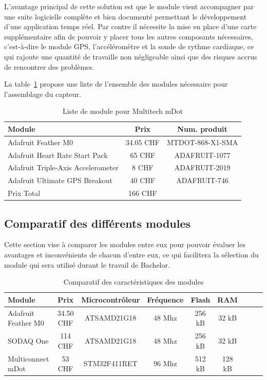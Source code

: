 L’avantage principal de cette solution est que le module vient accompagner par une suite logicielle complète et bien documenté permettant le développement d’une application temps réel. Par contre il nécessite la mise en place d’une carte supplémentaire afin de pouvoir y placer tous les autres composants nécessaires, c’est-à-dire le module GPS, l’accéléromètre et la sonde de rythme cardiaque, ce qui rajoute une quantité de travaille non négligeable ainsi que des risques accrus de rencontrer des problèmes.

La table~\ref{tab:mdot_liste} propose une liste de l'ensemble des modules nécessaire pour l'assemblage du capteur.

\begin{table}[htb]
\caption[Multitech mDot List]{Liste de module pour Multitech mDot}
\label{tab:mdot_liste}
\centering
\begin{tabular}{lcc}
\toprule
Module & Prix & Num. produit \\ 
\midrule
Adafruit Feather M0 & 34.05 CHF & MTDOT-868-X1-SMA \\
Adafruit Heart Rate Start Pack & 65 CHF & ADAFRUIT-1077 \\
Adafruit Triple-Axis Accelerometer & 8 CHF & ADAFRUIT-2019 \\
Adafruit Ultimate GPS Breakout & 40 CHF & ADAFRUIT-746 \\
\midrule
Prix Total & 166 CHF &  \\
\bottomrule 
\end{tabular}
\end{table}

\subsection{Comparatif des différents modules}

Cette section vise à comparer les modules entre eux pour pouvoir évaluer les avantages et inconvénients de chacun d’entre eux, ce qui facilitera la sélection du module qui sera utilisé durant le travail de Bachelor.

\begin{table}[htb]
\caption[Comparatif Microcontroleur]{Comparatif des caractéristiques des modules}
\label{tab:comparatif_micro}
\centering
\begin{tabular}{lcccccccc}
\toprule
Module & Prix & Microcontrôleur & Fréquence & Flash & RAM  \\ 
\midrule
Adafruit Feather M0	& 34.50 CHF	& ATSAMD21G18 & 48 Mhz & 256 kB & 32 kB & \\
SODAQ One	& 114 CHF & ATSAMD21G18 & 48 Mhz & 256 kB & 32 kB \\
Multiconnect mDot & 53 CHF & STM32F411RET & 96 Mhz & 512 kB & 128 kB \\
\bottomrule 
\end{tabular}
\end{table}

